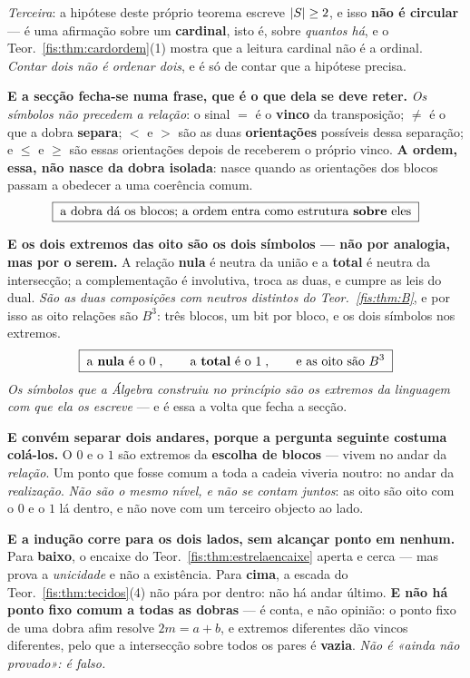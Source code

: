\documentclass[livro.tex]{subfiles}
\begin{document}
\emph{Terceira}: a hipótese deste próprio teorema escreve $\lvert S\rvert\ge2$, e isso
\textbf{não é circular} --- é uma afirmação sobre um \textbf{cardinal}, isto é,
sobre \emph{quantos há}, e o Teor.~\ref{fis:thm:cardordem}(1) mostra que a leitura
cardinal não é a ordinal. \emph{Contar dois não é ordenar dois}, e é só de contar
que a hipótese precisa.

\medskip\noindent\textbf{E a secção fecha-se numa frase, que é o que dela se
deve reter.} \emph{Os símbolos não precedem a relação}: o sinal $=$ é o
\textbf{vinco} da transposição; $\neq$ é o que a dobra \textbf{separa}; $<$ e $>$
são as duas \textbf{orientações} possíveis dessa separação; e $\le$ e $\ge$ são
essas orientações depois de receberem o próprio vinco. \textbf{A ordem, essa, não
nasce da dobra isolada}: nasce quando as orientações dos blocos passam a obedecer
a uma coerência comum.
\[
\boxed{\;\text{a dobra dá os blocos; a ordem entra como estrutura \textbf{sobre} eles}\;}
\]

\medskip\noindent\textbf{E os dois extremos das oito são os dois símbolos ---
não por analogia, mas por o serem.} A relação \textbf{nula} é neutra da união e a
\textbf{total} é neutra da intersecção; a complementação é involutiva, troca as
duas, e cumpre as leis do dual. \emph{São as duas composições com neutros
distintos do Teor.~\ref{fis:thm:B}}, e por isso as oito relações são $B^{3}$:
três blocos, um bit por bloco, e os dois símbolos nos extremos.
\[
\boxed{\;\text{a \textbf{nula} é o }0\;,\qquad \text{a \textbf{total} é o }1\;,\qquad \text{e as oito são }B^{3}\;}
\]
\emph{Os símbolos que a Álgebra construiu no princípio são os extremos da
linguagem com que ela os escreve} --- e é essa a volta que fecha a secção.

\medskip\noindent\textbf{E convém separar dois andares, porque a pergunta
seguinte costuma colá-los.} O $0$ e o $1$ são extremos da \textbf{escolha de
blocos} --- vivem no andar da \emph{relação}. Um ponto que fosse comum a toda a
cadeia viveria noutro: no andar da \emph{realização}. \emph{Não são o mesmo
nível, e não se contam juntos}: as oito são oito com o $0$ e o $1$ lá dentro, e
não nove com um terceiro objecto ao lado.

\medskip\noindent\textbf{E a indução corre para os dois lados, sem alcançar
ponto em nenhum.} Para \textbf{baixo}, o encaixe do
Teor.~\ref{fis:thm:estrelaencaixe} aperta e cerca --- mas prova a
\emph{unicidade} e não a existência. Para \textbf{cima}, a escada do
Teor.~\ref{fis:thm:tecidos}(4) não pára por dentro: não há andar último.
\textbf{E não há ponto fixo comum a todas as dobras} --- é conta, e não opinião:
o ponto fixo de uma dobra afim resolve $2m=a+b$, e extremos diferentes dão vincos
diferentes, pelo que a intersecção sobre todos os pares é \textbf{vazia}.
\emph{Não é «ainda não provado»: é falso.}
\end{document}
